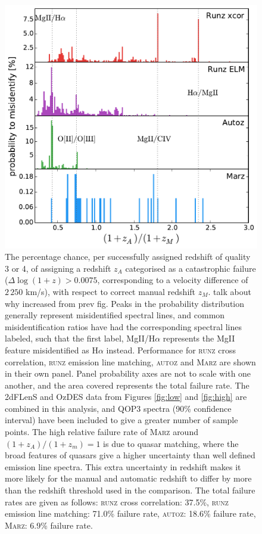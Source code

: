 \documentclass[iop]{emulateapj}
\newcommand{\red}{\color{red}}
\newcommand{\runz}{\textsc{runz}}
\newcommand{\autoz}{\textsc{autoz}}
\newcommand{\marz}{\textsc{Marz}}
\begin{document}
\begin{figure}[h]
\centering
\includegraphics[width=\columnwidth]{errorRateqop3.pdf}
\caption{The percentage chance, per successfully assigned redshift of quality 3 or 4, of assigning a redshift $z_A$ categorised as a catastrophic failure ($\Delta \log(1 + z) > 0.0075$, corresponding to a velocity difference of $2\,250$ km/s), with respect to correct manual redshift $z_M$. {\red talk about why increased from prev fig}. Peaks in the probability distribution generally represent misidentified spectral lines, and common misidentification ratios have had the corresponding spectral lines labeled, such that the first label, MgII/H$\alpha$ represents the MgII feature misidentified as H$\alpha$ instead. Performance for \runz{} cross correlation, \runz{} emission line matching, \autoz{} and \marz{} are shown in their own panel. Panel probability axes are not to scale with one another, and the area covered represents the total failure rate. The 2dFLenS and OzDES data from Figures \ref{fig:low} and \ref{fig:high} are combined in this analysis, and QOP3 spectra (90\% confidence interval) have been included to give a greater number of sample points. The high relative failure rate of \marz{} around $(1+z_A)/(1+z_m) = 1$ is due to quasar matching, where the broad features of quasars give a higher uncertainty than well defined emission line spectra. This extra uncertainty in redshift makes it more likely for the manual and automatic redshift to differ by more than the redshift threshold used in the comparison. The total failure rates are given as follows: \runz{} cross correlation: 37.5\%, \runz{} emission line matching: 71.0\% failure rate, \autoz{}: 18.6\% failure rate, \marz{}: 6.9\% failure rate.}
\label{fig:f4}
\end{figure}
\end{document}
